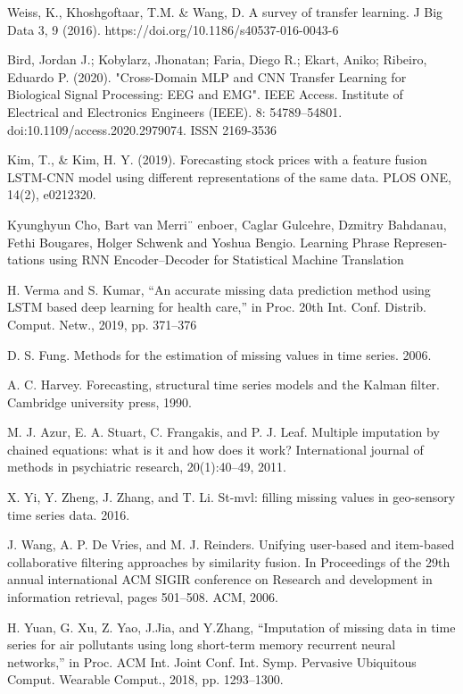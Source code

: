 \documentclass[12pt]{report}
\begin{document}
\begin{thebibliography}{}
 Weiss, K., Khoshgoftaar, T.M. \& Wang, D. A survey of transfer learning. J Big Data 3, 9 (2016). https://doi.org/10.1186/s40537-016-0043-6

 Bird, Jordan J.; Kobylarz, Jhonatan; Faria, Diego R.; Ekart, Aniko; Ribeiro, Eduardo P. (2020). "Cross-Domain MLP and CNN Transfer Learning for Biological Signal Processing: EEG and EMG". IEEE Access. Institute of Electrical and Electronics Engineers (IEEE). 8: 54789–54801. doi:10.1109/access.2020.2979074. ISSN 2169-3536

 Kim, T., \& Kim, H. Y. (2019). Forecasting stock prices with a feature fusion LSTM-CNN model using different representations of the same data. PLOS ONE, 14(2), e0212320.

 Kyunghyun Cho, Bart van Merri¨ enboer, Caglar Gulcehre, Dzmitry Bahdanau, Fethi Bougares, Holger Schwenk and Yoshua Bengio. Learning Phrase Represen-tations using RNN Encoder–Decoder for Statistical Machine Translation

  H. Verma and S. Kumar, “An accurate missing data prediction method using LSTM based deep learning for health care,” in Proc. 20th Int. Conf. Distrib. Comput. Netw., 2019, pp. 371–376

 D. S. Fung. Methods for the estimation of missing values in time series. 2006.

 A. C. Harvey. Forecasting, structural time series models and the Kalman filter. Cambridge university press, 1990.

 M. J. Azur, E. A. Stuart, C. Frangakis, and P. J. Leaf. Multiple imputation by chained equations: what is it and how does it work? International journal of methods in psychiatric research, 20(1):40–49, 2011.

 X. Yi, Y. Zheng, J. Zhang, and T. Li. St-mvl: filling missing values in geo-sensory time series data. 2016.

 J. Wang, A. P. De Vries, and M. J. Reinders. Unifying user-based and item-based collaborative filtering approaches by similarity fusion. In Proceedings of the 29th annual international ACM SIGIR conference on Research and development in information retrieval, pages 501–508. ACM, 2006.

 H. Yuan, G. Xu, Z. Yao, J.Jia, and Y.Zhang, “Imputation of missing data in time series for air pollutants using long short-term memory recurrent neural networks,” in Proc. ACM Int. Joint Conf. Int. Symp. Pervasive Ubiquitous Comput. Wearable Comput., 2018, pp. 1293–1300.


\end{thebibliography}
\end{document}
